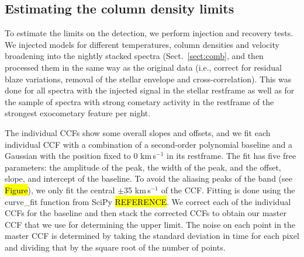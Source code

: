 \documentclass{aa}
\newcommand{\bp}{Beta Pictoris}
\begin{document}




\subsection{Estimating the  column density limits}\label{sect:CNlim}
To estimate the limits on the  detection, we perform injection and recovery tests. We injected models for different temperatures, column densities and velocity broadening into the nightly stacked spectra (Sect.~\ref{sect:comb}, and then processed them in the same way as the original data (i.e., correct for residual blaze variations, removal of the stellar envelope and cross-correlation). This was done for all spectra with the injected signal in the stellar restframe as well as for the sample of spectra with strong cometary activity in the restframe of the strongest exocometary feature per night.

The individual CCFs show some overall slopes and offsets, and we fit each individual CCF with a combination of a second-order polynomial baseline and a Gaussian with the position fixed to 0 km\,s$^{-1}$ in its restframe. The fit has five free parameters: the amplitude of the peak, the width of the peak, and the offset, slope, and intercept of the baseline. To avoid the aliasing peaks of the  band (see \hl{Figure}), we only fit the central $\pm$35 km\,s$^{-1}$ of the CCF. Fitting is done using the curve\_fit function from SciPy \hl{REFERENCE}.
We correct each of the individual CCFs for the baseline and then stack the corrected CCFs to obtain our master CCF that we use for determining the upper limit. The noise on each point in the master CCF is determined by taking the standard deviation in time for each pixel and dividing that by the square root of the number of points.
\end{document}

